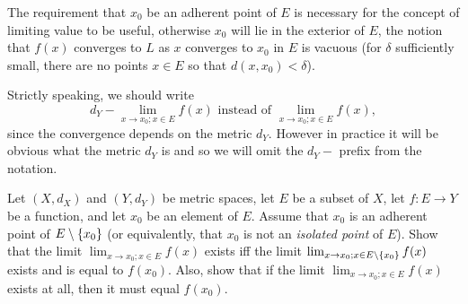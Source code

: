 \begin{rmk}\label{3.1.7}
  The requirement that \(x_0\) be an adherent point of \(E\) is necessary for the concept of limiting value to be useful, otherwise \(x_0\) will lie in the exterior of \(E\), the notion that \(f(x)\) converges to \(L\) as \(x\) converges to \(x_0\) in \(E\) is vacuous
  (for \(\delta\) sufficiently small, there are no points \(x \in E\) so that \(d(x, x_0) < \delta\)).
\end{rmk}

\begin{rmk}\label{3.1.8}
  Strictly speaking, we should write
  \[
    d_Y - \lim_{x \to x_0 ; x \in E} f(x) \text{ instead of } \lim_{x \to x_0 ; x \in E} f(x),
  \]
  since the convergence depends on the metric \(d_Y\).
  However in practice it will be obvious what the metric \(d_Y\) is and so we will omit the \(d_Y -\) prefix from the notation.
\end{rmk}

\exercisesection

\begin{ex}\label{ex:3.1.1}
  Let \((X, d_X)\) and \((Y, d_Y)\) be metric spaces, let \(E\) be a subset of \(X\), let \(f : E \to Y\) be a function, and let \(x_0\) be an element of \(E\).
  Assume that \(x_0\) is an adherent point of \(E \setminus \left\lbrace x_0\right\rbrace\)
  (or equivalently, that \(x_0\) is not an \emph{isolated point} of \(E\)).
  Show that the limit \(\lim_{x \to x_0 ; x \in E} f(x)\) exists iff the limit \(\lim_{x \to x_0 ; x \in E \setminus \left\lbrace x_0\right\rbrace} f(x)\) exists and is equal to \(f(x_0)\).
  Also, show that if the limit \(\lim_{x \to x_0 ; x \in E} f(x)\) exists at all, then it must equal \(f(x_0)\).
\end{ex}

